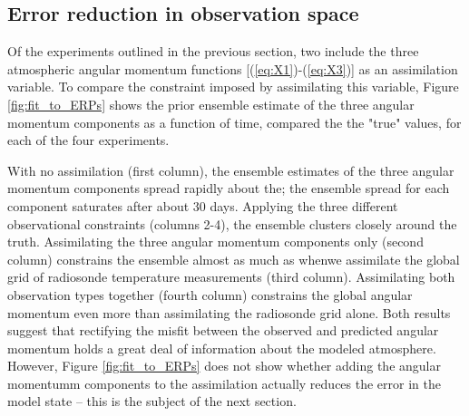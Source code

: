 
\subsection{Error reduction in observation space}
Of the experiments outlined in the previous section, two include the three atmospheric angular momentum functions [(\ref{eq:X1})-(\ref{eq:X3})] as an assimilation variable. 
To compare the constraint imposed by assimilating this variable, Figure \ref{fig:fit_to_ERPs} shows the prior ensemble estimate of the three angular momentum components as a function of time, compared the the "true" values, for each of the four experiments.

With no assimilation (first column), the ensemble estimates of the three angular momentum components spread rapidly about the; the ensemble spread for each component saturates after about 30 days.
Applying the three different observational constraints (columns 2-4), the ensemble clusters closely around the truth.
Assimilating the three angular momentum components only (second column) constrains the ensemble almost as much as whenwe assimilate the global grid of radiosonde temperature measurements (third column).
Assimilating both observation types together (fourth column) constrains the global angular momentum even more than assimilating the radiosonde grid alone. 
Both results suggest that rectifying the misfit between the observed and predicted angular momentum holds a great deal of information about the modeled atmosphere. 
However, Figure \ref{fig:fit_to_ERPs} does not show whether adding the angular momentumm components to the assimilation actually reduces the error in the model state -- this is the subject of the next section.
